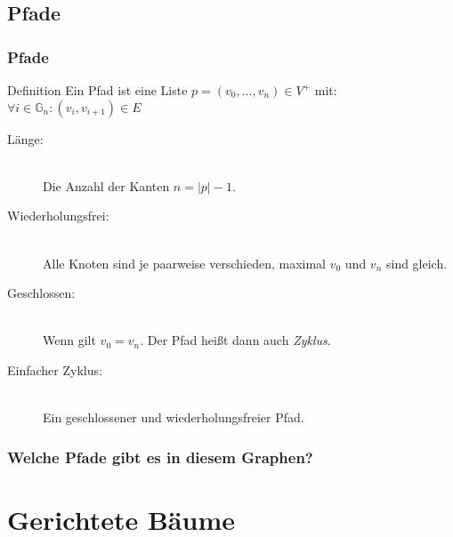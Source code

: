 \subsection{Pfade}
\begin{frame}
	\frametitle{Pfade}
	\begin{block}{Definition}
		Ein Pfad ist eine Liste $p=(v_0, \ldots ,v_n) \in V^+$ mit: $\forall i \in {\mathbb G}_n: (v_i,v_{i+1})\in E$
		\begin{description}
			\item[Länge:]\hfill \\
        Die Anzahl der Kanten $n = |p| - 1$. \pause
			\item[Wiederholungsfrei:] \hfill \\
        Alle Knoten sind je paarweise verschieden, maximal $v_0$ und $v_n$ sind gleich. \pause
			\item[Geschlossen:] \hfill \\
        Wenn gilt $v_0 = v_n$. Der Pfad heißt dann auch \emph{Zyklus}.\pause
			\item[Einfacher Zyklus:] \hfill \\
        Ein geschlossener und wiederholungsfreier Pfad.
    \end{description}
	\end{block}
\end{frame}
\begin{frame}[fragile]
  \frametitle{Welche Pfade gibt es in diesem Graphen?}
    \begin{figure}
    \end{figure}
\end{frame}

\section{Gerichtete Bäume}
